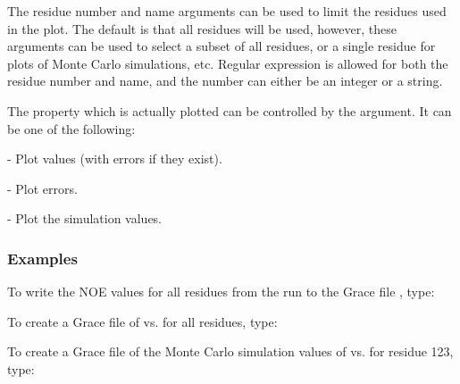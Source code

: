 The residue number and name arguments can be used to limit the residues used in the plot.
The default is that all residues will be used, however, these arguments can be used to
select a subset of all residues, or a single residue for plots of Monte Carlo simulations,
etc.  Regular expression is allowed for both the residue number and name, and the number can
either be an integer or a string.

The property which is actually plotted can be controlled by the 
 argument.  It
can be one of the following:
    
 - Plot values (with errors if they exist).
    
 - Plot errors.
    
   - Plot the simulation values.


\subsubsection{Examples}

To write the NOE values for all residues from the run 
 to the Grace file 
,
type:







To create a Grace file of 
 vs. 
 for all residues, type:






To create a Grace file of the Monte Carlo simulation values of 
 vs. 
 for residue
123, type:


